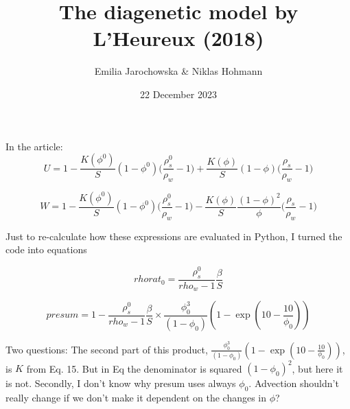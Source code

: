 \documentclass[11pt, letterpaper]{article}
\title{The diagenetic model by L'Heureux (2018)}
\author{Emilia Jarochowska & Niklas Hohmann}
\date{22 December 2023}
\begin{document}
\maketitle

In the article:
\begin{equation}
    U = 1 - \frac{K(\phi^0)}{S}(1-\phi^0)\big(\frac{\rho_s^0}{\rho_w} - 1 \big) + \frac{K(\phi)}{S}(1-\phi) \big(\frac{\rho_s}{\rho_w}-1\big)
\end{equation}

\begin{equation}
    W = 1 - \frac{K(\phi^0)}{S}(1-\phi^0) \big(\frac{\rho_s^0}{\rho_w}-1) - \frac{K(\phi)}{S} \frac{(1-\phi)^2}{\phi}\big(\frac{\rho_s}{\rho_w}-1\big)
\end{equation}

Just to re-calculate how these expressions are evaluated in Python, I turned the code into equations

\begin{equation}
    rhorat_0 = \frac{\rho_s^0}{rho_w - 1} \frac{\beta}{S}
\end{equation}

\begin{equation}
    presum = 1 - \frac{\rho_s^0}{rho_w - 1} \frac{\beta}{S} \times \frac{\phi_0^3}{(1 - \phi_0)} \left(1 - \exp\left(10 - \frac{10}{\phi_0} \right) \right)  
\end{equation}

Two questions:
The second part of this product, $\frac{\phi_0^3}{(1 - \phi_0)} \left(1 - \exp\left(10 - \frac{10}{\phi_0} \right) \right)$, is $K$ from Eq. 15. But in Eq the denominator is squared $(1 - \phi_0)^2$, but here it is not.
Secondly, I don't know why presum uses always $\phi_0$. Advection shouldn't really change if we don't make it dependent on the changes in $\phi$?
\end{document}
